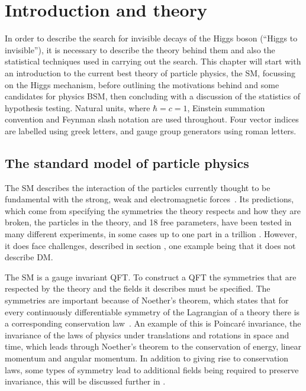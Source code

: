 \chapter{Introduction and theory}
\label{chap:theory}
In order to describe the search for invisible decays of the Higgs boson (``Higgs to invisible''), it is necessary to describe the theory behind them and also the statistical techniques used in carrying out the search. This chapter will start with an introduction to the current best theory of particle physics, the \ac{SM}, focussing on the Higgs mechanism, before outlining the motivations behind and some candidates for physics \ac{BSM}, then concluding with a discussion of the statistics of hypothesis testing. Natural units, where $\hbar=c=1$, Einstein summation convention and Feynman slash notation are used throughout. Four vector indices are labelled using greek letters, and gauge group generators using roman letters.


\section{The standard model of particle physics}
\label{sec:SM}
The SM describes the interaction of the particles currently thought to be fundamental with the strong, weak and electromagnetic forces~\cite{GlashowPartialSymmetries,WeinbergModelOfLeptons,SalamNobelSymposium}. Its predictions, which come from specifying the symmetries the theory respects and how they are broken, the particles in the theory, and 18 free parameters, have been tested in many different experiments, in some cases up to one part in a trillion \cite{PhysRevLett.100.120801}. However, it does face challenges, described in section , one example being that it does not describe \ac{DM}. 

The SM is a gauge invariant \ac{QFT}. To construct a QFT the symmetries that are respected by the theory and the fields it describes must be specified. The symmetries are important because of Noether's theorem, which states that for every continuously differentiable symmetry of the Lagrangian of a theory there is a corresponding conservation law~\cite{Noether:1918zz,doi:10.1080/00411457108231446}. An example of this is Poincar\'e invariance, the invariance of the laws of physics under translations and rotations in space and time, which leads through Noether's theorem to the conservation of energy, linear momentum and angular momentum. In addition to giving rise to conservation laws, some types of symmetry lead to additional fields being required to preserve invariance, this will be discussed further in  \cite{PhysRev.96.191}.


